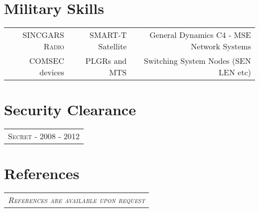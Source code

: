 \documentclass[a4paper,10pt]{article}
\newcommand{\fivenotes}{%
\textcolor{noteone}{\symbol{"2022}}
\textcolor{notetwo}{\symbol{"2022}}
\textcolor{notethree}{\symbol{"2022}}
\textcolor{notefour}{\symbol{"2022}}
\textcolor{notefive}{\symbol{"2022}}
}
\newcommand{\fournotes}{%
\textcolor{noteone}{\symbol{"2022}}
\textcolor{notetwo}{\symbol{"2022}}
\textcolor{notethree}{\symbol{"2022}}
\textcolor{notefour}{\symbol{"2022}}
\textcolor{white}{\symbol{"2022}}
}
\newcommand{\threenotes}{%
\textcolor{noteone}{\symbol{"2022}}
\textcolor{notetwo}{\symbol{"2022}}
\textcolor{notethree}{\symbol{"2022}}
\textcolor{white}{\symbol{"2022}}
\textcolor{white}{\symbol{"2022}}
}
\begin{document}
\section{Military Skills}
\begin{tabular}{r r r }
 \textsc{SINCGARS Radio}\small\emph{\fivenotes} & SMART-T Satellite \small\emph{\fournotes} & General Dynamics C4 - MSE Network Systems\small\emph{\fournotes} \\ COMSEC devices\small\emph{\fournotes} & PLGRs and MTS \small\emph{\threenotes} & Switching System Nodes (SEN LEN etc) \small\emph{\threenotes}
\end{tabular}

\section{Security Clearance}
 \begin{tabular}{p{15.5cm}}
 \textsc{Secret - 2008 - 2012}
\end{tabular}

\section{References}
 \begin{tabular}{p{15.5cm}}
 \textsc{\emph{References are available upon request}}
\end{tabular}
\end{document}
